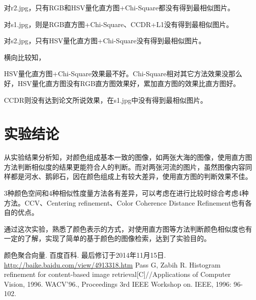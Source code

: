 \documentclass[a4paper, 12pt, UTF8]{article}
\begin{document}
对r2.jpg，只有RGB和HSV量化直方图+Chi-Square都没有得到最相似图片。

对s1.jpg，则是RGB直方图+Chi-Square、CCDR+L1没有得到最相似图片。

对s2.jpg，只有HSV量化直方图+Chi-Square没有得到最相似图片。

横向比较知，

HSV量化直方图+Chi-Square效果最不好。Chi-Square相对其它方法效果没那么好，HSV量化直方图没有RGB直方图效果好，累加直方图的效果比直方图好。

CCDR则没有达到论文所说效果，在s1.jpg中没有得到最相似图片。

\section{实验结论}

从实验结果分析知，对颜色组成基本一致的图像，如两张大海的图像，使用直方图方法判断相似度的结果更能符合人的判断。而对两张河流的图片，虽然图像内容同样都是河水、鹅卵石，因在颜色组成上有较大差异，使用直方图的判断效果不佳。

3种颜色空间和4种相似性度量方法各有差异，可以考虑在进行比较时综合考虑4种方法。CCV、Centering refinement、Color Coherence Distance Refinement也有各自的优点。

通过这次实验，熟悉了颜色表示的方式，对使用直方图等方法判断颜色相似度也有一定的了解，实现了简单的基于颜色的图像检索，达到了实验目的。


\renewcommand{\refname}{参考}
\begin{thebibliography}{9}
 颜色聚合向量. 百度百科. 最后修订于2014年11月15日. \url{http://baike.baidu.com/view/4913318.htm}
 Pass G, Zabih R. Histogram refinement for content-based image retrieval[C]//Applications of Computer Vision, 1996. WACV'96., Proceedings 3rd IEEE Workshop on. IEEE, 1996: 96-102.
\end{thebibliography}
\end{document}

